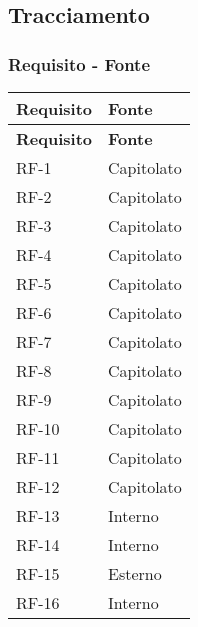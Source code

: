 \subsection{Tracciamento}
\subsubsection{Requisito - Fonte}
\begin{longtable}{|>{\centering\arraybackslash}m{}|>{\centering\arraybackslash}m{}|}
	\hline
	\textbf{Requisito} & \textbf{Fonte}                 \\\hline
	\endfirsthead
	\hline
	\textbf{Requisito} & \textbf{Fonte}                 \\\hline
	\endhead
	RF-1               & Capitolato                     \\\hline
	RF-2               & Capitolato                     \\\hline
	RF-3               & Capitolato                     \\\hline
	RF-4               & Capitolato                     \\\hline
	RF-5               & Capitolato                     \\\hline
	RF-6               & Capitolato                     \\\hline
	RF-7               & Capitolato                     \\\hline
	RF-8               & Capitolato                     \\\hline
	RF-9               & Capitolato                     \\\hline
	RF-10              & Capitolato                     \\\hline
	RF-11              & Capitolato                     \\\hline
	RF-12              & Capitolato                     \\\hline
	RF-13              & Interno                        \\\hline
	RF-14              & Interno                        \\\hline
	RF-15              & Esterno                        \\\hline
	RF-16              & Interno                        \\\hline

\end{longtable}
